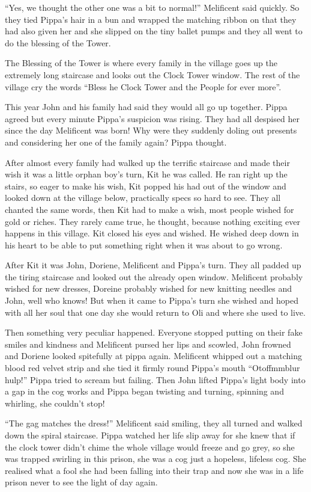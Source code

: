 ``Yes, we thought the other one was a bit to normal!'' Melificent said
quickly. So they tied Pippa's hair in a bun and wrapped the matching
ribbon on that they had also given her and she slipped on the tiny
ballet pumps and they all went to do the blessing of the Tower.

The Blessing of the Tower is where every family in the village goes up
the extremely long staircase and looks out the Clock Tower window. The
rest of the village cry the words ``Bless he Clock Tower and the People
for ever more''.

This year John and his family had said they would all go up together.
Pippa agreed but every minute Pippa's suspicion was rising. They had all
despised her since the day Melificent was born! Why were they suddenly
doling out presents and considering her one of the family again? Pippa
thought.

After almost every family had walked up the terrific staircase and made
their wish it was a little orphan boy's turn, Kit he was called. He ran
right up the stairs, so eager to make his wish, Kit popped his had out
of the window and looked down at the village below, practically specs so
hard to see. They all chanted the same words, then Kit had to make a
wish, most people wished for gold or riches. They rarely came true, he
thought, because nothing exciting ever happens in this village. Kit
closed his eyes and wished. He wished deep down in his heart to be able
to put something right when it was about to go wrong.

After Kit it was John, Doriene, Melificent and Pippa's turn. They all
padded up the tiring staircase and looked out the already open window.
Melificent probably wished for new dresses, Doreine probably wished for
new knitting needles and John, well who knows! But when it came to
Pippa's turn she wished and hoped with all her soul that one day she
would return to Oli and where she used to live.

Then something very peculiar happened. Everyone stopped putting on their
fake smiles and kindness and Melificent pursed her lips and scowled,
John frowned and Doriene looked spitefully at pippa again. Melificent
whipped out a matching blood red velvet strip and she tied it firmly
round Pippa's mouth ``Otoffmmblur hulp!'' Pippa tried to scream but
failing. Then John lifted Pippa's light body into a gap in the cog works
and Pippa began twisting and turning, spinning and whirling, she
couldn't stop!

``The gag matches the dress!'' Melificent said smiling, they all turned
and walked down the spiral staircase. Pippa watched her life slip away
for she knew that if the clock tower didn't chime the whole village
would freeze and go grey, so she was trapped swirling in this prison,
she was a cog just a hopeless, lifeless cog. She realised what a fool
she had been falling into their trap and now she was in a life prison
never to see the light of day again.

